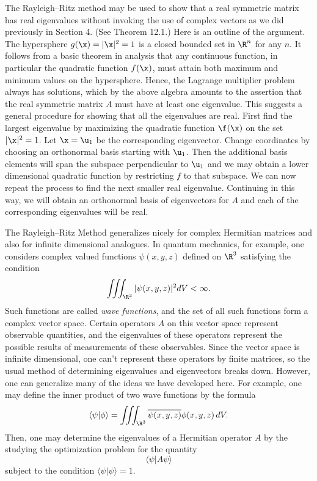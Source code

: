 \medskip
The Rayleigh--Ritz method may be used to show that a real
symmetric matrix has real eigenvalues without invoking the use
of complex vectors as we did previously in Section 4.  (See
Theorem 12.1.)
Here is an outline of the argument.
The hypersphere $g(\x) = |\x|^2 = 1$ is a closed bounded set in
$\R^n$ for any $n$. 
It follows from a basic theorem in analysis that any continuous
function, in particular the quadratic function
 $f(\x)$, must attain both maximum and minimum values on the
hypersphere.
Hence, the Lagrange multiplier problem always has solutions,
which by the above algebra amounts to the
assertion that the real symmetric matrix
$A$ must have at least one eigenvalue.   This suggests a general
procedure for showing that all the eigenvalues are real.
First find the largest eigenvalue by maximizing the quadratic
function $\f(\x)$ on the set
$|\x|^2 = 1$.   Let $\x = \u_1$ be the corresponding eigenvector.  
Change coordinates by choosing an orthonormal basis
starting with $\u_1$.  Then the additional basis elements will span
the subspace perpendicular to $\u_1$ and we may obtain a lower dimensional
quadratic function by restricting $f$ to that subspace.   We can now
repeat the process to find the next smaller real eigenvalue.
Continuing in this way, we will obtain an orthonormal basis of
eigenvectors for $A$ and each of the corresponding eigenvalues
will be real.

    The Rayleigh--Ritz Method generalizes
nicely for complex Hermitian matrices
and also for  infinite dimensional analogues.   In quantum mechanics,
for example, one considers complex valued functions $\psi(x,y,z)$
defined on $\R^3$ satisfying the condition
$$
\iiint_{\R^3}|\psi(x,y,z)|^2 dV < \infty.
$$
Such functions are called {\it wave functions\/}, and the
set of all such functions form a complex vector space.  Certain
operators $A$ on this vector space represent observable
quantities, and the eigenvalues of these operators represent
the possible results of measurements of these observables.
Since the vector space is infinite dimensional, one can't represent
these operators by finite matrices, so the usual method of
determining eigenvalues and eigenvectors breaks down.  However,
one can generalize many of the ideas we have developed here.
For example, one may define the inner product of two wave functions
by the formula
$$
     \langle\psi | \phi\rangle = \iiint_{\R^3}\overline{\psi(x,y,z)}
\phi(x,y,z)\, dV.
$$
Then, one may determine the eigenvalues of a Hermitian operator
$A$ by the studying the optimization problem for the quantity
$$
     \langle\psi | A\psi\rangle 
$$
subject to the condition $\langle \psi | \psi \rangle = 1$.


